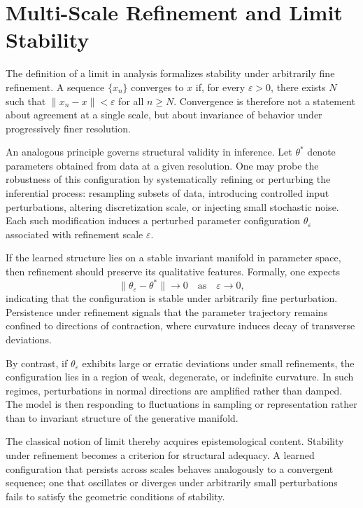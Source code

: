 \documentclass[12pt]{book}
\begin{document}
\section{Multi-Scale Refinement and Limit Stability}

The definition of a limit in analysis formalizes stability under arbitrarily fine refinement. A sequence $\{x_n\}$ converges to $x$ if, for every $\varepsilon > 0$, there exists $N$ such that $\|x_n - x\| < \varepsilon$ for all $n \ge N$. Convergence is therefore not a statement about agreement at a single scale, but about invariance of behavior under progressively finer resolution.

An analogous principle governs structural validity in inference. Let $\theta^*$ denote parameters obtained from data at a given resolution. One may probe the robustness of this configuration by systematically refining or perturbing the inferential process: resampling subsets of data, introducing controlled input perturbations, altering discretization scale, or injecting small stochastic noise. Each such modification induces a perturbed parameter configuration $\theta_\varepsilon$ associated with refinement scale $\varepsilon$.

If the learned structure lies on a stable invariant manifold in parameter space, then refinement should preserve its qualitative features. Formally, one expects
\[
\|\theta_\varepsilon - \theta^*\| \to 0
\quad \text{as} \quad \varepsilon \to 0,
\]
indicating that the configuration is stable under arbitrarily fine perturbation. Persistence under refinement signals that the parameter trajectory remains confined to directions of contraction, where curvature induces decay of transverse deviations.

By contrast, if $\theta_\varepsilon$ exhibits large or erratic deviations under small refinements, the configuration lies in a region of weak, degenerate, or indefinite curvature. In such regimes, perturbations in normal directions are amplified rather than damped. The model is then responding to fluctuations in sampling or representation rather than to invariant structure of the generative manifold.

The classical notion of limit thereby acquires epistemological content. Stability under refinement becomes a criterion for structural adequacy. A learned configuration that persists across scales behaves analogously to a convergent sequence; one that oscillates or diverges under arbitrarily small perturbations fails to satisfy the geometric conditions of stability.
\end{document}
